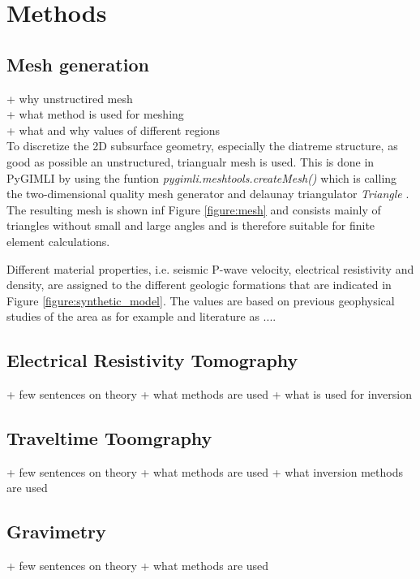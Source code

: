 \section{Methods}\label{section:Methods}

\subsection{Mesh generation}\label{section:Mesh}
+ why unstructired mesh \\
+ what method is used for meshing\\
+ what and why values of different regions\\

To discretize the 2D subsurface geometry, especially the diatreme structure, as good as possible an unstructured, triangualr mesh is used. This is done in PyGIMLI by using the funtion \textit{pygimli.meshtools.createMesh()} which is calling the two-dimensional quality mesh generator and delaunay triangulator \textit{Triangle} \citep{shewchuk1996triangle}. The resulting mesh is shown inf Figure \ref{figure:mesh} and consists mainly of triangles without small and large angles and is therefore suitable for finite element calculations. 

Different material properties, i.e. seismic P-wave velocity, electrical resistivity and density, are assigned to the  different geologic formations that are indicated in Figure \ref{figure:synthetic_model}. The values are based on previous geophysical studies of the area as for example \citet{NiklasPlumpe.2015,TimGilberti.2020} and literature as ....

\subsection{Electrical Resistivity Tomography}\label{section:ERT}
+ few sentences on theory
+ what methods are used
+ what is used for inversion

\subsection{Traveltime Toomgraphy}\label{section:TT}
+ few sentences on theory
+ what methods are used
+ what inversion methods are used

\subsection{Gravimetry}\label{section:Gravimetry}
+ few sentences on theory
+ what methods are used